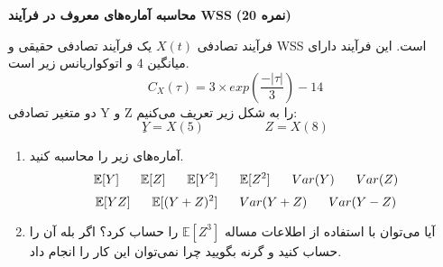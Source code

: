 \Large \textbf{محاسبه آماره‌های معروف در فرآیند WSS}
\large \textbf{(20 نمره)}

\normalsize \vspace{0.5cm}
فرآیند تصادفی
$ X(t) $
یک فرآیند تصادفی حقیقی و WSS است. این فرآیند دارای میانگین 4 و اتوکواریانس زیر است.
$$
C_X(\tau) = 3 \times exp(\frac{-|\tau|}{3}) - 14
$$
دو متغیر تصادفی Y و Z را به شکل زیر تعریف می‌کنیم:
$$
ِY = X(5)  \hspace{2cm} Z = X(8)
$$
\begin{enumerate}[label=(\alph*)]
	\item
آماره‌های زیر را محاسبه کنید.
$$
\mathbb{E}[Y] 
\hspace{0.6cm} 
\mathbb{E}[Z] 
\hspace{0.6cm}
\mathbb{E}[Y^2] 
\hspace{0.6cm} 
\mathbb{E}[Z^2] 
\hspace{0.6cm}
Var(Y)
\hspace{0.6cm} 
Var(Z)
$$
$$
\mathbb{E}[YZ] 
\hspace{0.6cm} 
\mathbb{E}[(Y+Z)^2] 
\hspace{0.6cm}
Var(Y + Z)
\hspace{0.6cm}
Var(Y - Z)
$$
	\item 
آیا می‌توان با استفاده از اطلاعات مساله
$ \mathbb{E}[Z^3] $
را حساب کرد؟ اگر بله آن را حساب کنید و گرنه بگویید چرا نمی‌توان این کار را انجام داد.
\end{enumerate}



